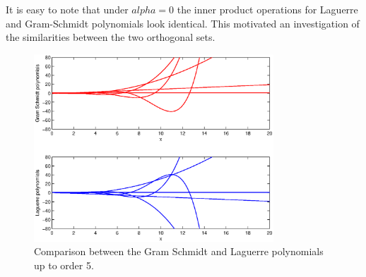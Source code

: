 \documentclass[a4paper]{article}
\numberwithin{equation}{section}
\begin{document}
It is easy to note that under $alpha = 0$ the inner product operations for Laguerre and Gram-Schmidt polynomials look identical. This motivated an investigation of the similarities between the two orthogonal sets.

\begin{figure}
\centering
\includegraphics[width=0.8\textwidth]{gs_laguerre_comparison.eps}
\caption{\label{fig:gslaguerrecomparison}Comparison between the Gram Schmidt and Laguerre polynomials up to order 5.}
\end{figure}
\end{document}
